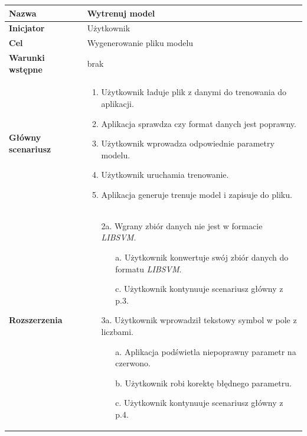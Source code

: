 \documentclass[paper=a4, fontsize=11pt]{scrartcl} %
\numberwithin{equation}{section} %
\numberwithin{figure}{section} %
\begin{document}
\begin{tabular}{|l|l|}  \hline
    \textbf{Nazwa} & Wytrenuj model \\\hline
    \textbf{Inicjator} & Użytkownik \\\hline
    \textbf{Cel} & Wygenerowanie pliku modelu \\\hline
    \textbf{Warunki wstępne} & brak\\\hline
    \textbf{Główny scenariusz} & 
    \begin{minipage}{5in}
        \vskip 4pt
        \begin{enumerate}
            \item Użytkownik ładuje plik z danymi do trenowania do aplikacji.
            \item Aplikacja sprawdza czy format danych jest poprawny.
            \item Użytkownik wprowadza odpowiednie parametry modelu.
            \item Użytkownik uruchamia trenowanie.
            \item Aplikacja generuje trenuje model i zapisuje do pliku.
        \end{enumerate}
        \vskip 4pt
    \end{minipage}
    \\\hline

    \textbf{Rozszerzenia} & 
    \begin{minipage}{5in}
        \vskip 4pt
        \begin{itemize}
            \item[2a.] Wgrany zbiór danych nie jest w formacie \textit{LIBSVM}.
                \begin{itemize}
                    \item[a.] Użytkownik konwertuje swój zbiór danych do formatu \textit{LIBSVM}.
                    \item[c.] Użytkownik kontynuuje scenariusz główny z p.3.
                \end{itemize}
            \item[3a.] Użytkownik wprowadził tekstowy symbol w pole z liczbami.
                \begin{itemize}
                    \item[a.] Aplikacja podświetla niepoprawny parametr na czerwono.
                    \item[b.] Użytkownik robi korektę błędnego parametru.
                    \item[c.] Użytkownik kontynuuje scenariusz główny z p.4.
                \end{itemize}
        \end{itemize}
        \vskip 4pt
    \end{minipage}
    \\\hline
\end{tabular}
\end{document}
